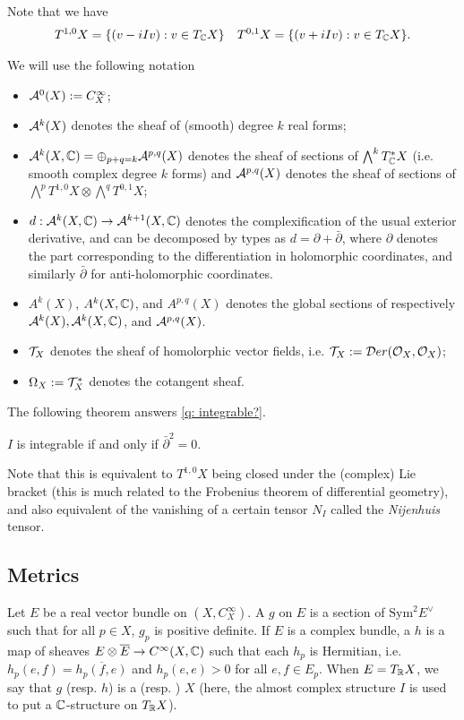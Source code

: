 Note that we have
\begin{align*}
	T^{1,0}X=\{(v-iIv):v\in T_\mathbb C X\}&&T^{0,1}X=\{(v+iIv):v\in T_\mathbb C X\}.
\end{align*}
\begin{notation}
	We will use the following notation
	\begin{itemize}
		\item $\mathcal{A}^0(X):=C^\infty_X$;
		\item $\mathcal{A}^k(X)$ denotes the sheaf of (smooth) degree $k$ real forms;
		\item $\mathcal{A}^k(X,\mathbb C)=\oplus_{p+q=k}\mathcal{A}^{p,q}(X)$ denotes the sheaf of sections of $\bigwedge^kT_\mathbb C^*X$ (i.e. smooth complex degree $k$ forms) and $\mathcal{A}^{p,q}(X)$ denotes the sheaf of sections of $\bigwedge^pT^{1,0}X\otimes \bigwedge^q T^{0,1}X$;
		\item $d:\mathcal{A}^k(X,\mathbb C)\to \mathcal{A}^{k+1}(X,\mathbb C)$ denotes the complexification of the usual exterior derivative, and can be decomposed by types as $d=\partial+\bar\partial$, where $\partial$ denotes the part corresponding to the differentiation in holomorphic coordinates, and similarly $\bar\partial$ for anti-holomorphic coordinates.
		\item $A^k(X)$, $A^k(X,\mathbb C)$, and $A^{p,q}(X)$ denotes the global sections of respectively $\mathcal{A}^k(X),\mathcal{A}^k(X,\mathbb C)$, and $\mathcal{A}^{p,q}(X)$.\
		\item $\mathcal{T}_X$ denotes the sheaf of homolorphic vector fields, i.e. $\mathcal{T}_X:=\mathcal{D} er(\mathcal{O}_X,\mathcal{O}_X)$;
		\item $\Omega_X:=\mathcal{T}_X^*$ denotes the cotangent sheaf.\qedbarhere
	\end{itemize}
\end{notation}
The following theorem answers \autoref{q: integrable?}.
\begin{theorem}
	$I$ is integrable if and only if $\bar{\partial}^2=0$.
\end{theorem}
Note that this is equivalent to $T^{1,0}X$ being closed under the (complex) Lie bracket (this is much related to the Frobenius theorem of differential geometry), and also equivalent of the vanishing of a certain tensor $N_I$ called the \emph{Nijenhuis} tensor. 
\subsection{Metrics}
Let $E$ be a real vector bundle on $(X,C_X^\infty)$. A  $g$ on $E$ is a section of $\text{Sym}^2E^\vee$ such that for all $p\in X$, $g_p$ is positive definite. If $E$ is a complex bundle, a  $h$ is a map of sheaves $E\otimes \overline E\to C^\infty(X,\mathbb C)$ such that each $h_p$ is Hermitian, i.e. $h_p(e,f)=\overline{h_p(f,e)}$ and $h_p(e,e)>0$ for all $e,f\in E_p$.  When $E=T_\mathbb R X$, we say that $g$ (resp. $h$) is a  (resp. )  $X$ (here, the almost complex structure $I$ is used to put a $\mathbb C$-structure on $T_\mathbb R X$).

